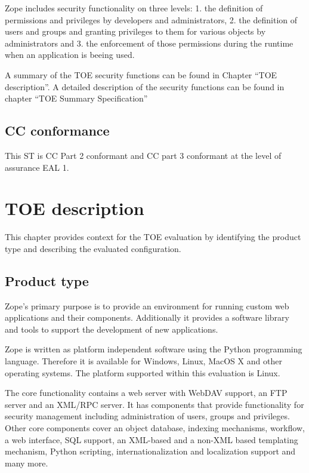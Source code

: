 \documentclass[12pt,english]{scrbook}
\begin{document}
Zope includes security functionality on three levels: 1. the definition of
permissions and privileges by developers and administrators, 2. the definition
of users and groups and granting privileges to them for various objects by
administrators and 3. the enforcement of those permissions during the runtime 
when an application is beeing used.

A summary of the TOE security functions can be found in Chapter ``TOE
description''. A detailed description of the security functions can be found in
chapter ``TOE Summary Specification''


\section{CC conformance}

This ST is CC Part 2 conformant and CC part 3 conformant at the level of
assurance EAL 1.





\chapter{TOE description}

This chapter provides context for the TOE evaluation by identifying the product
type and describing the evaluated configuration.



\section{Product type}

Zope's primary purpose is to provide an environment for running custom web
applications and their components. Additionally it provides a software library
and tools to support the development of new applications.

Zope is written as platform independent software using the Python programming
language. Therefore it is available for Windows, Linux, MacOS X and other
operating systems. The platform supported within this evaluation is Linux. 

The core functionality contains a web server with WebDAV support, an FTP server
and an XML/RPC server. It has components that provide functionality for
security management including administration of users, groups and privileges.
Other core components cover an object database, indexing mechanisms, workflow,
a web interface, SQL support, an XML-based and a non-XML based templating
mechanism, Python scripting, internationalization and localization support and
many more.
\end{document}
